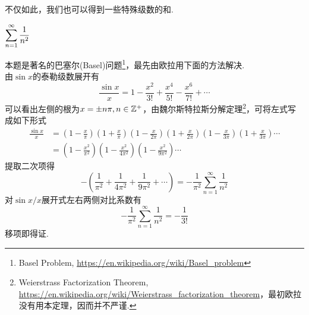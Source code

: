 \par 不仅如此，我们也可以得到一些特殊级数的和.
\begin{example}
\label{ex:square_reciprocal_sum}
$\displaystyle\sum_{n=1}^{\infty}\dfrac{1}{n^2}$
\end{example}
\begin{analysis}
本题是著名的巴塞尔(Basel)问题\footnote{Basel Problem, \url{https://en.wikipedia.org/wiki/Basel_problem}}，最先由欧拉用下面的方法解决.\\
由$\sin x$的泰勒级数展开有
\[{\displaystyle {\frac {\sin x}{x}}=1-{\frac {x^{2}}{3!}}+{\frac {x^{4}}{5!}}-{\frac {x^{6}}{7!}}+\cdots }\]
可以看出左侧的根为$x=\pm n\pi,n\in\mathbb{Z}^+$，由魏尔斯特拉斯分解定理\footnote{Weierstrass Factorization Theorem, \url{https://en.wikipedia.org/wiki/Weierstrass_factorization_theorem}，最初欧拉没有用本定理，因而并不严谨.}，可将左式写成如下形式
\[{\displaystyle {\begin{aligned}{\frac {\sin x}{x}}&=\left(1-{\frac {x}{\pi }}\right)\left(1+{\frac {x}{\pi }}\right)\left(1-{\frac {x}{2\pi }}\right)\left(1+{\frac {x}{2\pi }}\right)\left(1-{\frac {x}{3\pi }}\right)\left(1+{\frac {x}{3\pi }}\right)\cdots \\&=\left(1-{\frac {x^{2}}{\pi ^{2}}}\right)\left(1-{\frac {x^{2}}{4\pi ^{2}}}\right)\left(1-{\frac {x^{2}}{9\pi ^{2}}}\right)\cdots \end{aligned}}}\]
提取二次项得
\[{\displaystyle -\left({\frac {1}{\pi ^{2}}}+{\frac {1}{4\pi ^{2}}}+{\frac {1}{9\pi ^{2}}}+\cdots \right)=-{\frac {1}{\pi ^{2}}}\sum _{n=1}^{\infty }{\frac {1}{n^{2}}}}\]
对$\sin x/x$展开式左右两侧对比系数有
\[-{\frac {1}{\pi ^{2}}}\sum _{n=1}^{\infty }{\frac {1}{n^{2}}}=-{\frac {1}{3!}}\]
移项即得证.
\end{analysis}